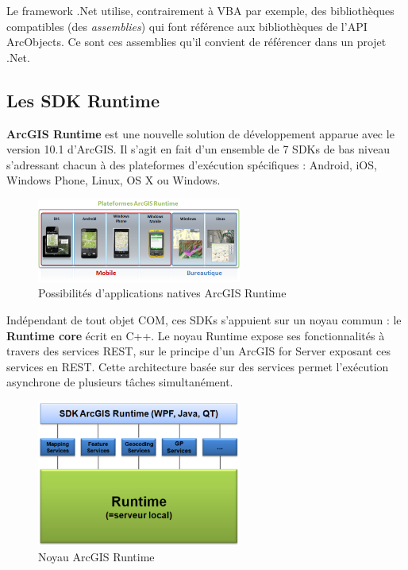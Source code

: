 \documentclass[11pt]{article}
\begin{document}
Le framework .Net utilise, contrairement à VBA par exemple, des bibliothèques compatibles (des \textit{assemblies}) qui font référence aux bibliothèques de l'API ArcObjects. Ce sont ces assemblies qu'il convient de référencer dans un projet .Net.


\subsection{Les SDK Runtime}
\textbf{ArcGIS Runtime} est une nouvelle solution de développement apparue avec le version 10.1 d'ArcGIS. Il s'agit en fait d'un ensemble de 7 SDKs de bas niveau s'adressant chacun à des plateformes d'exécution spécifiques : Android, iOS, Windows Phone, Linux, OS X ou Windows.

\begin{figure}[H]
	\center \includegraphics[width=0.6\textwidth]{img/cours/arcgis_runtime-1.png}
	\caption{Possibilités d'applications natives ArcGIS Runtime}
\end{figure}

Indépendant de tout objet COM, ces SDKs s'appuient sur un noyau commun : le \textbf{Runtime core} écrit en C++. Le noyau Runtime expose ses fonctionnalités à travers des services REST, sur le principe d'un ArcGIS for Server exposant ces services en REST. Cette architecture basée sur des services permet l'exécution asynchrone de plusieurs tâches simultanément. 

\begin{figure}[H]
	\center \includegraphics[width=0.6\textwidth]{img/cours/arcgis_runtime-2.png}
	\caption{Noyau ArcGIS Runtime}
\end{figure}
\end{document}
